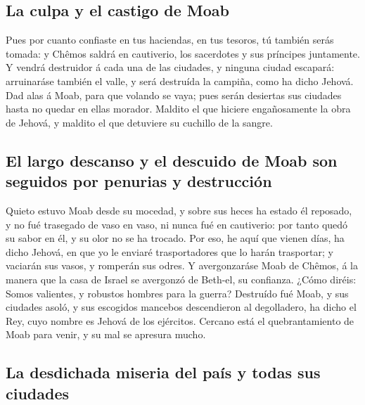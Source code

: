 \hypertarget{la-culpa-y-el-castigo-de-moab}{%
\subsection{La culpa y el castigo de
Moab}\label{la-culpa-y-el-castigo-de-moab}}

 Pues por cuanto confiaste en tus haciendas, en tus tesoros,
tú también serás tomada: y Chêmos saldrá en cautiverio, los sacerdotes y
sus príncipes juntamente.  Y vendrá destruidor á cada una de
las ciudades, y ninguna ciudad escapará: arruinaráse también el valle, y
será destruída la campiña, como ha dicho Jehová.  Dad alas á
Moab, para que volando se vaya; pues serán desiertas sus ciudades hasta
no quedar en ellas morador.  Maldito el que hiciere
engañosamente la obra de Jehová, y maldito el que detuviere su cuchillo
de la sangre.

\hypertarget{el-largo-descanso-y-el-descuido-de-moab-son-seguidos-por-penurias-y-destrucciuxf3n}{%
\subsection{El largo descanso y el descuido de Moab son seguidos por
penurias y
destrucción}\label{el-largo-descanso-y-el-descuido-de-moab-son-seguidos-por-penurias-y-destrucciuxf3n}}

 Quieto estuvo Moab desde su mocedad, y sobre sus heces ha
estado él reposado, y no fué trasegado de vaso en vaso, ni nunca fué en
cautiverio: por tanto quedó su sabor en él, y su olor no se ha trocado.
 Por eso, he aquí que vienen días, ha dicho Jehová, en que
yo le enviaré trasportadores que lo harán trasportar; y vaciarán sus
vasos, y romperán sus odres.  Y avergonzaráse Moab de
Chêmos, á la manera que la casa de Israel se avergonzó de Beth-el, su
confianza.  ¿Cómo diréis: Somos valientes, y robustos
hombres para la guerra?  Destruído fué Moab, y sus ciudades
asoló, y sus escogidos mancebos descendieron al degolladero, ha dicho el
Rey, cuyo nombre es Jehová de los ejércitos.  Cercano está
el quebrantamiento de Moab para venir, y su mal se apresura mucho.

\hypertarget{la-desdichada-miseria-del-pauxeds-y-todas-sus-ciudades}{%
\subsection{La desdichada miseria del país y todas sus
ciudades}\label{la-desdichada-miseria-del-pauxeds-y-todas-sus-ciudades}}

